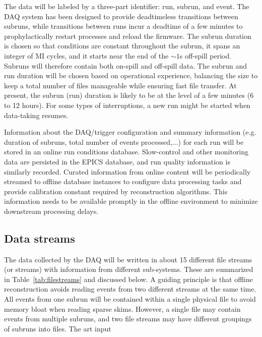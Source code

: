 The data will be labeled by a three-part identifier: run, subrun, and event. The DAQ system has been designed to provide deadtimeless transitions between subruns, while transitions between runs incur a deadtime of a few minutes to prophylactically restart processes and reload the firmware. The subrun duration is chosen so that conditions are constant throughout the subrun, it spans an integer of MI cycles, and it starts near the end of the $\sim 1$s off-spill period. Subruns will therefore contain both on-spill and off-spill data. The subrun and run duration will be chosen based on operational experience, balancing the size to keep a total number of files manageable while ensuring fast file transfer. At present, the subrun (run) duration is likely to be at the level of a few minutes (6 to 12 hours). For some types of interruptions, a new run might be started when data-taking resumes.

Information about the DAQ/trigger configuration and summary information (e.g. duration of subruns, total number of events processed,...) for each run will be stored in an online run conditions database. Slow-control and other monitoring data are persisted in the EPICS database, and run quality information is similarly recorded. Curated information from online content will be periodically streamed to offline database instances to configure data processing tasks and provide calibration constant required by reconstruction algorithms. This information needs to be available promptly in the offline environment to minimize downstream processing delays. 


\subsection{Data streams}
The data collected by the DAQ will be written in about 15 different file streams (or streams) with information from different sub-systems. These are summarized in Table~\ref{tab:filestreams} and discussed below. A guiding principle is that offline reconstruction avoids reading events from two different streams at the same time. All events from one subrun will be contained within a single physical file to avoid memory bloat when reading sparse skims. However, a single file may contain events from multiple subruns, and two file streams may have different groupings of subruns into files. The art input 

